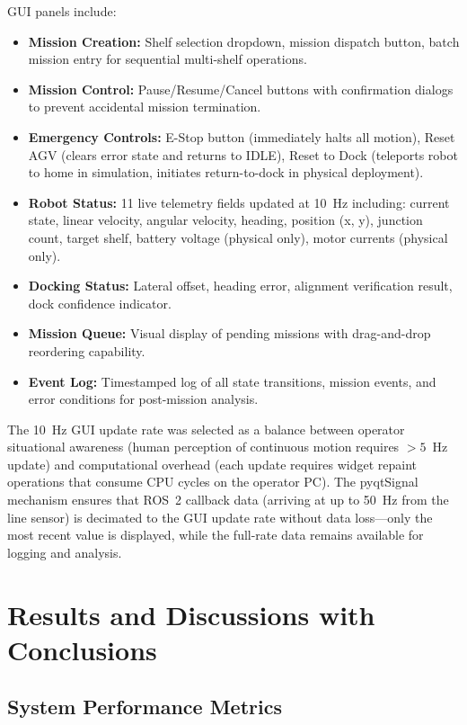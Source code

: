 \documentclass[12pt,a4paper,oneside]{report}
\begin{document}
GUI panels include:
\begin{itemize}
\item \textbf{Mission Creation:} Shelf selection dropdown, mission dispatch button, batch mission entry for sequential multi-shelf operations.
\item \textbf{Mission Control:} Pause/Resume/Cancel buttons with confirmation dialogs to prevent accidental mission termination.
\item \textbf{Emergency Controls:} E-Stop button (immediately halts all motion), Reset AGV (clears error state and returns to IDLE), Reset to Dock (teleports robot to home in simulation, initiates return-to-dock in physical deployment).
\item \textbf{Robot Status:} 11 live telemetry fields updated at 10~Hz including: current state, linear velocity, angular velocity, heading, position (x, y), junction count, target shelf, battery voltage (physical only), motor currents (physical only).
\item \textbf{Docking Status:} Lateral offset, heading error, alignment verification result, dock confidence indicator.
\item \textbf{Mission Queue:} Visual display of pending missions with drag-and-drop reordering capability.
\item \textbf{Event Log:} Timestamped log of all state transitions, mission events, and error conditions for post-mission analysis.
\end{itemize}

The 10~Hz GUI update rate was selected as a balance between operator situational awareness (human perception of continuous motion requires $>5$~Hz update) and computational overhead (each update requires widget repaint operations that consume CPU cycles on the operator PC). The pyqtSignal mechanism ensures that ROS~2 callback data (arriving at up to 50~Hz from the line sensor) is decimated to the GUI update rate without data loss---only the most recent value is displayed, while the full-rate data remains available for logging and analysis.


\chapter{Results and Discussions with Conclusions}

\section{System Performance Metrics}
\end{document}
